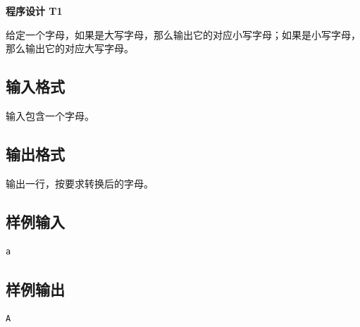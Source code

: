 \documentclass{article}
\newcommand{\problemname}[1]{\begin{center}\Large\bfseries #1\end{center}}
\begin{document}
\problemname{程序设计 T1}

给定一个字母，如果是大写字母，那么输出它的对应小写字母；如果是小写字母，那么输出它的对应大写字母。

\subsection*{输入格式}
输入包含一个字母。

\subsection*{输出格式}
输出一行，按要求转换后的字母。

\subsection*{样例输入}
\begin{verbatim}
a
\end{verbatim}

\subsection*{样例输出}
\begin{verbatim}
A
\end{verbatim}
\end{document}
